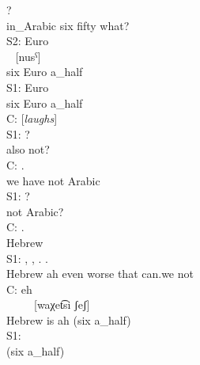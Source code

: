 {{ \gll  {}       ?\\
     in\_Arabic   six   fifty what?\\

\textup{S2:} \glll {}   Euro  \\
              [sitːe]     ~      [nu​sˁ]\\
           six    Euro          a\_half\\

\textup{S1:} \gll {}   Euro  \\
             six    Euro  a\_half\\

\textup{C:}   [\textit{laughs}]\\

\textup{S1:} \gll {} ?\\
          also  not?\\

\textup{C:} \gll  {}   .\\
         we  have   not    Arabic\\

\textup{S1:} \gll {} ?\\
        not    Arabic?\\

\textup{C:} \gll  {}.\\
         Hebrew\\

\textup{S1:} \gll {}, ,  .   .\\
         Hebrew     ah   even  worse       that  can.we    not\\

\textup{C:} \glll {}  eh      \\
       ~         ~   ~      {[waχet͡si} {ʃeʃ]}\\
        Hebrew    is   ah  {(six a\_half)}\\

\textup{S1:} \gll {}  \\
     {(six a\_half)}\\
\z
}
}

\renewcommand{\exfont}{\upshape}
\examplesroman

